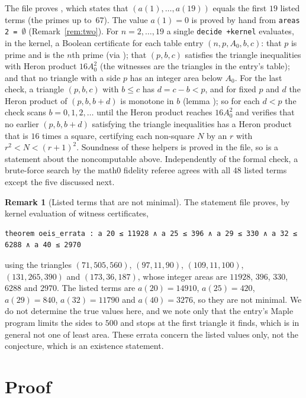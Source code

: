 \documentclass[11pt]{amsart}
\theoremstyle{plain}
\theoremstyle{definition}
\newtheorem{remark}[theorem]{Remark}
\begin{document}
The file proves , which states that $(a(1),\dots,a(19))$ equals the first $19$ listed terms (the primes up to~$67$).
The value $a(1)=0$ is proved by hand from \texttt{areas 2 =~}$\emptyset$ (Remark~\ref{rem:two}).
For $n=2,\dots,19$ a single \texttt{decide +kernel} evaluates, in the kernel, a Boolean certificate for each table entry $(n,p,A_0,b,c)$: that $p$ is prime and is the $n$th prime (via ); that $(p,b,c)$ satisfies the triangle inequalities with Heron product $16A_0^2$ (the witnesses are the triangles in the entry's table); and that no triangle with a side $p$ has an integer area below $A_0$.
For the last check, a triangle $(p,b,c)$ with $b\le c$ has $d=c-b<p$, and for fixed $p$ and $d$ the Heron product of $(p,b,b+d)$ is monotone in $b$ (lemma ); so for each $d<p$ the check scans $b=0,1,2,\dots$ until the Heron product reaches $16A_0^2$ and verifies that no earlier $(p,b,b+d)$ satisfying the triangle inequalities has a Heron product that is $16$ times a square, certifying each non-square $N$ by an $r$ with $r^2<N<(r+1)^2$.
Soundness of these helpers is proved in the file, so  is a statement about the noncomputable  above.
Independently of the formal check, a brute-force search by the math0 fidelity referee agrees with all $48$ listed terms except the five discussed next.

\begin{remark}[Listed terms that are not minimal]\label{rem:errata}
The statement file proves, by kernel evaluation of witness certificates,
\begin{lstlisting}
theorem oeis_errata : a 20 ≤ 11928 ∧ a 25 ≤ 396 ∧ a 29 ≤ 330 ∧ a 32 ≤ 6288 ∧ a 40 ≤ 2970
\end{lstlisting}
using the triangles $(71,505,560)$, $(97,11,90)$, $(109,11,100)$, $(131,265,390)$ and $(173,36,187)$, whose integer areas are $11928$, $396$, $330$, $6288$ and $2970$.
The listed terms are $a(20)=14910$, $a(25)=420$, $a(29)=840$, $a(32)=11790$ and $a(40)=3276$, so they are not minimal.
We do not determine the true values here, and we note only that the entry's Maple program limits the sides to $500$ and stops at the first triangle it finds, which is in general not one of least area.
These errata concern the listed values only, not the conjecture, which is an existence statement.
\end{remark}

\section{Proof}\label{sec:proof}
\end{document}
